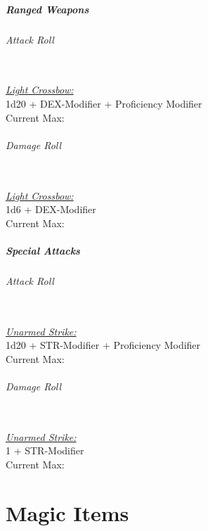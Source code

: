 \documentclass[letterpaper,openany,oneside,twocolumn]{book}
\begin{document}
\subsubsection*{Ranged Weapons}
\paragraph*{Attack Roll}\hfill\\
\underline{\textit{Light Crossbow:}}\\
1d20 + DEX-Modifier + Proficiency Modifier\\
\indent Current Max: 
\paragraph*{Damage Roll}\hfill\\
\underline{\textit{Light Crossbow:}}\\
1d6 + DEX-Modifier\\
\indent Current Max: 
\subsubsection*{Special Attacks}
\paragraph*{Attack Roll}\hfill\\
\underline{\textit{Unarmed Strike:}}\\
1d20 + STR-Modifier + Proficiency Modifier\\
\indent Current Max: 
\paragraph*{Damage Roll}\hfill\\
\underline{\textit{Unarmed Strike:}}\\
1 + STR-Modifier\\
\indent Current Max: 

\part*{Magic Items}
\end{document}
